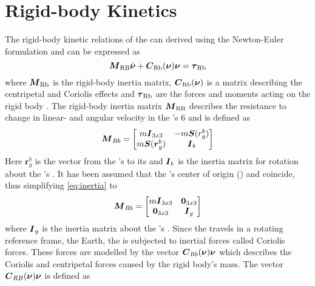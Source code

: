 \section{Rigid-body Kinetics}
The rigid-body kinetic relations of the \abbrROV can derived using the Newton-Euler formulation and can be expressed as
\begin{equation}\label{eq:rb}
\boldsymbol{M}_{\text{RB}}\dot{\boldsymbol{\nu}} + \boldsymbol{C}_{\text{Rb}}(\boldsymbol{\nu})\boldsymbol{\nu} = \boldsymbol{\tau}_{\text{Rb}}
\end{equation} where $\boldsymbol{M}_{\text{Rb}}$ is the rigid-body inertia matrix, $\boldsymbol{C}_{\text{Rb}}(\boldsymbol{\nu})$ is a matrix describing the centripetal and Coriolis effects and $\boldsymbol{\tau}_{\text{Rb}}$ are the forces and moments acting on the rigid body \citep[p. 45]{fossen2011}.
The rigid-body inertia matrix $\boldsymbol{M}_{\text{RB}}$ describes the resistance to change in linear- and angular velocity in the \abbrROV's 6 \abbrDOF and is defined as 
\begin{equation}
\label{eq:inertia}
    \boldsymbol{M}_{Rb} = 
    \begin{bmatrix}
    m\boldsymbol{I}_{3x3}       & -m\boldsymbol{S}(r^b_g) \\
    m\boldsymbol{S}(\boldsymbol{r}^b_g) & \boldsymbol{I}_{b}
    \end{bmatrix}
\end{equation}
Here $\boldsymbol{r}^b_g$ is the vector from the \abbrROV's \abbrCO to its \abbrCG and $\boldsymbol{I}_{b}$ is the inertia matrix for rotation about the \abbrROV's \abbrCO \citep[p. 50-52]{fossen2011}.
It has been assumed that the \abbrROV's center of origin (\abbrCO) and \abbrCG coincide, thus simplifying \eqref{eq:inertia} to
\begin{equation}
   \boldsymbol{M}_{Rb} = 
    \begin{bmatrix}
        m\boldsymbol{I}_{3x3} & \boldsymbol{0}_{3x3} \\
        \boldsymbol{0}_{3x3} & \boldsymbol{I}_{g}
    \end{bmatrix}
\end{equation}
where $\boldsymbol{I}_{g}$ is the inertia matrix about the \abbrROV's \abbrCG.
Since the \abbrROV travels in a rotating reference frame, the Earth, the \abbrROV is subjected to inertial forces called Coriolis forces. These forces are modelled by the vector $\boldsymbol{C}_{Rb}(\boldsymbol{\nu})\boldsymbol{\nu}$ which describes the Coriolis and centripetal forces caused by the rigid body's mass. The vector $\boldsymbol{C}_{RB}(\boldsymbol{\nu})\boldsymbol{\nu}$ is defined as
